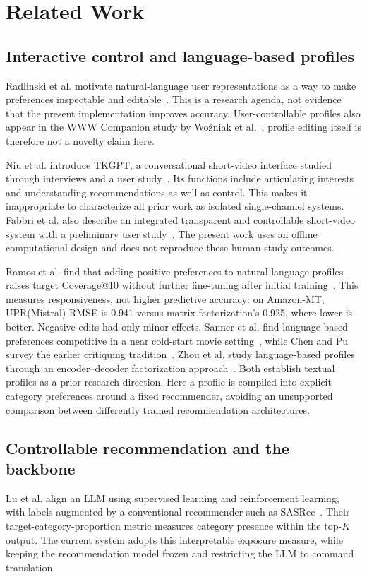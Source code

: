\documentclass[conference]{IEEEtran}
\begin{document}
\section{Related Work}
\subsection{Interactive control and language-based profiles}
Radlinski et al. motivate natural-language user representations as a way to make preferences inspectable and editable~\cite{radlinski2022profiles}. This is a research agenda, not evidence that the present implementation improves accuracy. User-controllable profiles also appear in the WWW Companion study by Wo{\'z}niak et al.~\cite{wozniak2025profiles}; profile editing itself is therefore not a novelty claim here.

Niu et al. introduce TKGPT, a conversational short-video interface studied through interviews and a user study~\cite{niu2025chat}. Its functions include articulating interests and understanding recommendations as well as control. This makes it inappropriate to characterize all prior work as isolated single-channel systems. Fabbri et al. also describe an integrated transparent and controllable short-video system with a preliminary user study~\cite{fabbri2026feeding}. The present work uses an offline computational design and does not reproduce these human-study outcomes.

Ramos et al. find that adding positive preferences to natural-language profiles raises target Coverage@10 without further fine-tuning after initial training~\cite{ramos2024transparent}. This measures responsiveness, not higher predictive accuracy: on Amazon-MT, UPR(Mistral) RMSE is 0.941 versus matrix factorization's 0.925, where lower is better. Negative edits had only minor effects. Sanner et al. find language-based preferences competitive in a near cold-start movie setting~\cite{sanner2023competitive}, while Chen and Pu survey the earlier critiquing tradition~\cite{chen2012critiquing}. Zhou et al. study language-based profiles through an encoder--decoder factorization approach~\cite{zhou2024language}. Both establish textual profiles as a prior research direction. Here a profile is compiled into explicit category preferences around a fixed recommender, avoiding an unsupported comparison between differently trained recommendation architectures.

\subsection{Controllable recommendation and the backbone}
Lu et al. align an LLM using supervised learning and reinforcement learning, with labels augmented by a conventional recommender such as SASRec~\cite{lu2024aligning}. Their target-category-proportion metric measures category presence within the top-$K$ output. The current system adopts this interpretable exposure measure, while keeping the recommendation model frozen and restricting the LLM to command translation.
\end{document}
